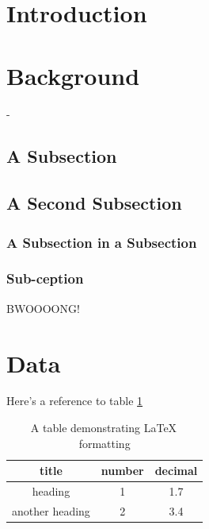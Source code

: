 \documentclass{workreport}
\begin{document}
\begin{body}
\section{Introduction}

\lipsum[1-6]

\section{Background}

\lipsum[1-2]-

	\subsection{A Subsection}

	\lipsum[1]

	\subsection{A Second Subsection}

	\lipsum[2]
	
	\subsubsection{A Subsection in a Subsection}
	
	\lipsum[1]
	
	\subsubsection{Sub-ception}
	
	\lipsum[1]
	
	BWOOOONG!

\section{Data}

\lipsum[1-2]

Here's a reference to table \ref{tbl:exampletable}

\begin{table}
	\centering
	\begin{tabular}{|c|c|c|} \hline
		title & number & decimal \\ \hline
		heading & 1 & 1.7 \\ \hline
		another heading & 2 & 3.4 \\ \hline
	\end{tabular}
	\caption{A table demonstrating \LaTeX \, formatting}
	\label{tbl:exampletable}
\end{table}


\end{body}
\end{document}
